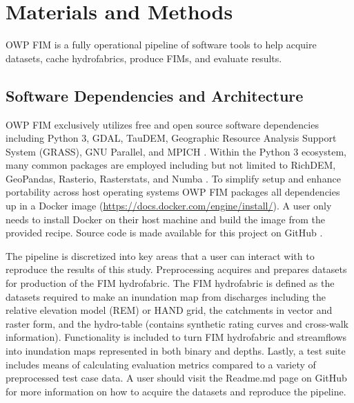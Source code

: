 
\section{Materials and Methods}
%
OWP FIM is a fully operational pipeline of software tools to help acquire datasets, cache hydrofabrics, produce FIMs, and evaluate results.
%
\subsection{Software Dependencies and Architecture}
%
OWP FIM exclusively utilizes free and open source software dependencies including Python 3, GDAL, TauDEM, Geographic Resource Analysis Support System (GRASS), GNU Parallel, and MPICH \cite{python382,gdal2020,tarboton2005terrain,grass2020,tange2015gnu,amer2021mpich}.
Within the Python 3 ecosystem, many common packages are employed including but not limited to RichDEM, GeoPandas, Rasterio, Rasterstats, and Numba \cite{barnes2018richdem,jordahl2014geopandas,lam2015numba}. 
To simplify setup and enhance portability across host operating systems OWP FIM packages all dependencies up in a Docker image (\url{https://docs.docker.com/engine/install/}). 
A user only needs to install Docker on their host machine and build the image from the provided recipe. 
Source code is made available for this project on GitHub \cite{inundationMapping2022}. 

The pipeline is discretized into key areas that a user can interact with to reproduce the results of this study. 
Preprocessing acquires and prepares datasets for production of the FIM hydrofabric. 
The FIM hydrofabric is defined as the datasets required to make an inundation map from discharges including the relative elevation model (REM) or HAND grid, the catchments in vector and raster form, and the hydro-table (contains synthetic rating curves and cross-walk information).
Functionality is included to turn FIM hydrofabric and streamflows into inundation maps represented in both binary and depths.
Lastly, a test suite includes means of calculating evaluation metrics compared to a variety of preprocessed test case data.
A user should visit the Readme.md page on GitHub for more information on how to acquire the datasets and reproduce the pipeline.
%
